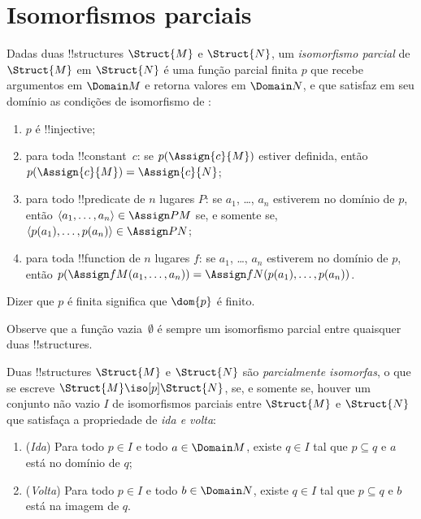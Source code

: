 \documentclass[../../../include/open-logic-section]{subfiles}
\begin{document}
\section{Isomorfismos parciais}

\begin{defn}
  Dadas duas !!{structure}s $\Struct{M}$ e $\Struct{N}$, um
  \emph{isomorfismo parcial} de $\Struct{M}$ em $\Struct{N}$ é uma
  função parcial finita $p$ que recebe argumentos em $\Domain M$ e retorna
  valores em $\Domain N$, e que satisfaz em seu domínio as condições de
  isomorfismo de :
  \begin{enumerate}
  \item $p$ é !!{injective};
  \item para toda !!{constant}~$c$: se $p(\Assign{c}{M})$ estiver definida,
    então $p(\Assign{c}{M}) = \Assign{c}{N}$;
  \item para todo !!{predicate} de $n$ lugares $P$: se $a_1$, \dots, $a_n$
    estiverem no domínio de $p$, então $\langle a_1, \dots, a_n\rangle \in
    \Assign P M$ se, e somente se, $\langle p(a_1), \dots, p(a_n) \rangle
    \in \Assign P N$;
  \item para toda !!{function} de $n$ lugares $f$: se $a_1$, \dots, $a_n$
    estiverem no domínio de $p$, então $p(\Assign f M (a_1, \dots,a_n))
    = \Assign f N (p(a_1), \dots, p(a_n))$.
  \end{enumerate}
  Dizer que $p$ é finita significa que $\dom{p}$ é finito.
\end{defn}

Observe que a função vazia~$\emptyset$ é sempre um isomorfismo parcial
entre quaisquer duas !!{structure}s.

\begin{defn}
  Duas !!{structure}s $\Struct{M}$ e $\Struct{N}$ são
  \emph{parcialmente isomorfas}, o que se escreve $\Struct{M} \iso[p]
  \Struct{N}$, se, e somente se, houver um conjunto não vazio $I$
  de isomorfismos parciais entre $\Struct{M}$ e $\Struct{N}$
  que satisfaça a propriedade de \emph{ida e volta}:
  \begin{enumerate}
  \item (\emph{Ida}) Para todo $p \in I$ e todo $a \in \Domain M$,
    existe $q \in I$ tal que $p \subseteq q$ e $a$ está
    no domínio de $q$;
  \item (\emph{Volta}) Para todo $p \in I$ e todo $b \in \Domain N$,
    existe $q \in I$ tal que $p \subseteq q$ e $b$ está
    na imagem de $q$.
  \end{enumerate}
\end{defn}
\end{document}
